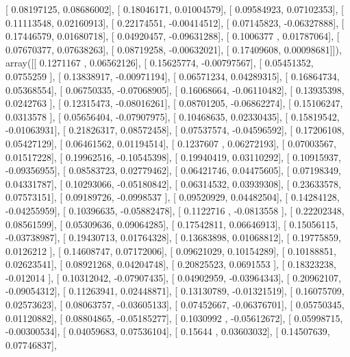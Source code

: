 \documentclass{article}
\begin{document}
       [ 0.08197125,  0.08686002],
       [ 0.18046171,  0.01004579],
       [ 0.09584923,  0.07102353],
       [ 0.11113548,  0.02160913],
       [ 0.22174551, -0.00414512],
       [ 0.07145823, -0.06327888],
       [ 0.17446579,  0.01680718],
       [ 0.04920457, -0.09631288],
       [ 0.1006377 ,  0.01787064],
       [ 0.07670377,  0.07638263],
       [ 0.08719258, -0.00632021],
       [ 0.17409608,  0.00098681]]), array([[ 0.1271167 ,  0.06562126],
       [ 0.15625774, -0.00797567],
       [ 0.05451352,  0.0755259 ],
       [ 0.13838917, -0.00971194],
       [ 0.06571234,  0.04289315],
       [ 0.16864734,  0.05368554],
       [ 0.06750335, -0.07068905],
       [ 0.16068664, -0.06110482],
       [ 0.13935398,  0.0242763 ],
       [ 0.12315473, -0.08016261],
       [ 0.08701205, -0.06862274],
       [ 0.15106247,  0.0313578 ],
       [ 0.05656404, -0.07907975],
       [ 0.10468635,  0.02330435],
       [ 0.15819542, -0.01063931],
       [ 0.21826317,  0.08572458],
       [ 0.07537574, -0.04596592],
       [ 0.17206108,  0.05427129],
       [ 0.06461562,  0.01194514],
       [ 0.1237607 ,  0.06272193],
       [ 0.07003567,  0.01517228],
       [ 0.19962516, -0.10545398],
       [ 0.19940419,  0.03110292],
       [ 0.10915937, -0.09356955],
       [ 0.08583723,  0.02779462],
       [ 0.06421746,  0.04475605],
       [ 0.07198349,  0.04331787],
       [ 0.10293066, -0.05180842],
       [ 0.06314532,  0.03939308],
       [ 0.23633578,  0.07573151],
       [ 0.09189726, -0.0998537 ],
       [ 0.09520929,  0.04482504],
       [ 0.14284128, -0.04255959],
       [ 0.10396635, -0.05882478],
       [ 0.1122716 , -0.0813558 ],
       [ 0.22202348,  0.08561599],
       [ 0.05309636,  0.09064285],
       [ 0.17542811,  0.06646913],
       [ 0.15056115, -0.03738987],
       [ 0.19430713,  0.01764328],
       [ 0.13683898,  0.01068812],
       [ 0.19775859,  0.0126212 ],
       [ 0.14608747,  0.07172006],
       [ 0.09621029,  0.10154289],
       [ 0.10188851,  0.02623541],
       [ 0.08921268,  0.04204748],
       [ 0.20825523,  0.0691553 ],
       [ 0.18323238, -0.012014  ],
       [ 0.10312042, -0.07907435],
       [ 0.04902959, -0.03964343],
       [ 0.20962107, -0.09054312],
       [ 0.11263941,  0.02448871],
       [ 0.13130789, -0.01321519],
       [ 0.16075709,  0.02573623],
       [ 0.08063757, -0.03605133],
       [ 0.07452667, -0.06376701],
       [ 0.05750345,  0.01120882],
       [ 0.08804865, -0.05185277],
       [ 0.1030992 , -0.05612672],
       [ 0.05998715, -0.00300534],
       [ 0.04059683,  0.07536104],
       [ 0.15644   ,  0.03603032],
       [ 0.14507639,  0.07746837],
\end{document}
